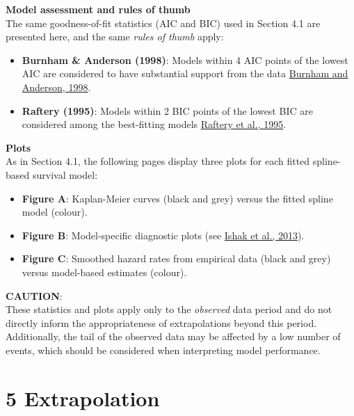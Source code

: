 \documentclass[
]{article}
\providecommand{\tightlist}{%
  \setlength{\itemsep}{0pt}\setlength{\parskip}{0pt}}
\begin{document}
\textbf{Model assessment and rules of thumb}\\
The same goodness-of-fit statistics (AIC and BIC) used in Section 4.1
are presented here, and the same \emph{rules of thumb} apply:

\begin{itemize}
\tightlist
\item
  \textbf{Burnham \& Anderson (1998)}: Models within 4 AIC points of the
  lowest AIC are considered to have substantial support from the data
  \href{https://doi.org/10.1007/978-1-4757-2917-7}{Burnham and Anderson,
  1998}.\\
\item
  \textbf{Raftery (1995)}: Models within 2 BIC points of the lowest BIC
  are considered among the best-fitting models
  \href{https://doi.org/10.2307/271063}{Raftery et al., 1995}.
\end{itemize}

\textbf{Plots}\\
As in Section 4.1, the following pages display three plots for each
fitted spline-based survival model:

\begin{itemize}
\tightlist
\item
  \textbf{Figure A}: Kaplan-Meier curves (black and grey) versus the
  fitted spline model (colour).\\
\item
  \textbf{Figure B}: Model-specific diagnostic plots (see
  \href{https://doi.org/10.1007/s40273-013-0064-3}{Ishak et al.,
  2013}).\\
\item
  \textbf{Figure C}: Smoothed hazard rates from empirical data (black
  and grey) versus model-based estimates (colour).
\end{itemize}

\textbf{CAUTION}:\\
These statistics and plots apply only to the \emph{observed} data period
and do not directly inform the appropriateness of extrapolations beyond
this period.\\
Additionally, the tail of the observed data may be affected by a low
number of events, which should be considered when interpreting model
performance.

\clearpage

\clearpage

\section{5 Extrapolation}\label{extrapolation}
\end{document}
